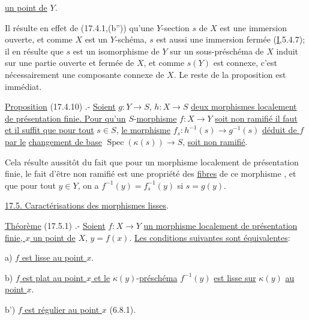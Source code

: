 \uline{un point de} $Y$.

Il résulte en effet de (17.4.1,(b'')) qu'une $Y$-section $s$ de $X$ est une immersion ouverte, et comme $X$ est un $Y$-schéma, $s$ est aussi une  immersion fermée (\uline{I},5.4.7); il en résulte que $s$ est un isomorphisme de $Y$ sur un sous-préschéma de $X$ induit sur une partie ouverte et fermée de $X$, et comme  $s(Y)$ est connexe, c'est nécessairement une composante connexe de $X$. Le reste de la proposition est immédiat.

\uline{Proposition} (17.4.10) .- \uline{Soient} $g:Y\to S$, $h:X\to S$ \uline{deux morphismes localement de présentation finie. Pour qu'un} $S$-\uline{morphisme} $f:X\to Y$ \uline{soit non ramifié il faut et il suffit que pour tout} $s\in S$, \uline{le morphisme} $f_s:h^{-1}(s)\to g^{-1}(s)$ \uline{déduit de $f$ par le}  \uline{changement de base} $\operatorname{Spec}(\kappa(s))\to S$, \uline{soit non ramifié}.

Cela résulte aussitôt du fait que pour un morphisme localement de présentation finie, le fait d'être non ramifié est une propriété des \uline{fibres} de ce morphisme , et  que pour tout $y\in Y$, on a $f^{-1}(y)=f_s^{-1}(y)$ si $s=g(y)$.

\uline{17.5. Caractérisations des morphismes lisses}.

\uline{Théorème} (17.5.1) .- \uline{Soient} $f:X\to Y$ \uline{un morphisme localement de présentation finie, $x$ un point de} $X$, $y=f(x)$. \uline{Les conditions suivantes sont équivalentes}:

a) \uline{$f$ est lisse au point $x$}.

b) \uline{$f$ est plat au point $x$ et le} $\kappa(y)$-\uline{préschéma} $f^{-1}(y)$ \uline{est lisse sur} $\kappa(y)$ \uline{au point $x$}.

b') \uline{$f$ est régulier au point $x$} (6.8.1).

